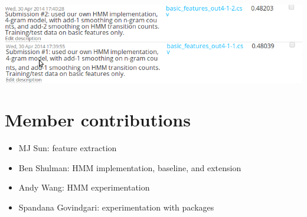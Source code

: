 \documentclass{article}
\begin{document}
\noindent
\includegraphics[width=\textwidth]{kagglesubs.png}\par\bigskip

\section{Member contributions}
\begin{itemize}[noitemsep]
  \item MJ Sun: feature extraction
  \item Ben Shulman: HMM implementation, baseline, and extension
  \item Andy Wang: HMM experimentation
  \item Spandana Govindgari: experimentation with packages
\end{itemize}
\end{document}

